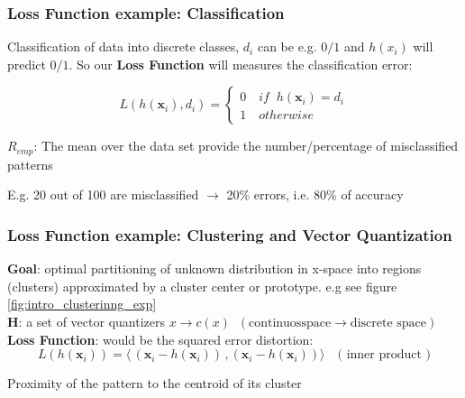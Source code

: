 \documentclass[../main.tex]{subfiles}
\begin{document}
\subsubsection{Loss Function example: Classification}
Classification of data into discrete classes, $d_i$ can be e.g. $0/1$ and $h(x_i)$ will predict $0/1$. So our \textbf{Loss Function} will measures the classification error:

\[
    L(h(\textbf{x}_{i}),d_{i}) = \left\{
                \begin{array}{ll}
                  0 \quad if \;\;h(\textbf{x}_{i}) = d_i\\
                  1 \quad otherwise
                \end{array}
              \right.
\]
 
\begin{center}
    $R_{emp}$: The mean over the data set provide the number/percentage of misclassified patterns
\end{center}

E.g. 20 out of 100 are misclassified $\rightarrow$ 20\% errors, i.e. 80\% of accuracy

\subsubsection{Loss Function example: Clustering and Vector Quantization}
\textbf{Goal}: optimal partitioning of unknown distribution in x-space into regions (clusters) approximated by a cluster center or prototype. e.g see figure \ref{fig:intro_clusterinng_exp}\\

\noindent \textbf{H}: a set of vector quantizers $ x \rightarrow c(x) \;\;( \text{continuosspace} \rightarrow \text{discrete space})$\\

\noindent \textbf{Loss Function}: would be the squared error distortion:
$$L(h(\textbf{x}_{i})) = \langle\,(\mathbf{x}_i - h(\mathbf{x}_i))\,, (\mathbf{x}_i - h(\mathbf{x}_i))\rangle \quad \text{( inner product )}$$

Proximity of the pattern to the centroid of its cluster
\end{document}
